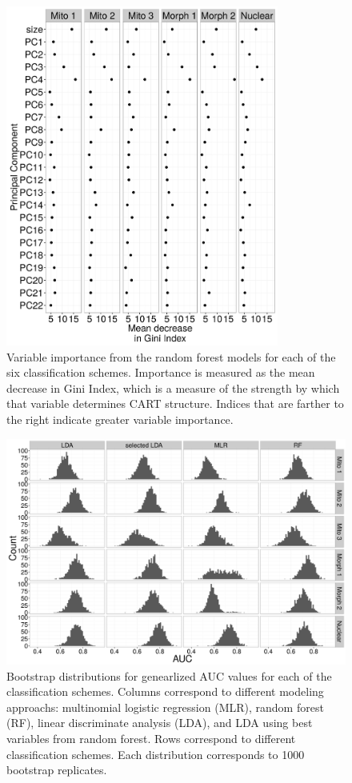 \documentclass[12pt,letterpaper]{article}
\begin{document}
\begin{figure}[h]
  \centering
  \includegraphics[height = 0.8\textheight, width = 0.8\textwidth, keepaspectratio = true]{figure/var_imp}
  \caption{Variable importance from the random forest models for each of the six classification schemes. Importance is measured as the mean decrease in Gini Index, which is a measure of the strength by which that variable determines CART structure. Indices that are farther to the right indicate greater variable importance.}
  \label{fig:var_imp}
\end{figure}

\begin{figure}[ht]
  \centering
  \includegraphics[height = 0.8\textheight, width = \textwidth, keepaspectratio = true]{figure/gen_res}
  \caption{Bootstrap distributions for genearlized AUC values for each of the classification schemes. Columns correspond to different modeling approachs: multinomial logistic regression (MLR), random forest (RF), linear discriminate analysis (LDA), and LDA using best variables from random forest. Rows correspond to different classification schemes. Each distribution corresponds to 1000 bootstrap replicates.}
  \label{fig:gen_hist}
\end{figure}
\end{document}
